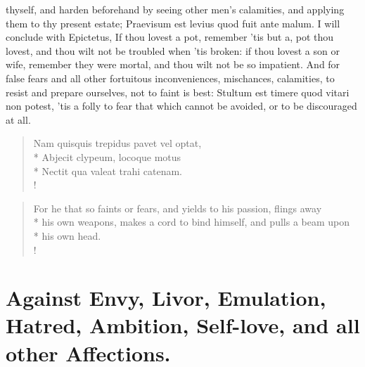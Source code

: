 {thyself, and harden beforehand by seeing other men's calamities, and
applying them to thy present estate; Praevisum est levius quod fuit
ante malum. I will conclude with Epictetus, If thou lovest a pot,
remember 'tis but a, pot thou lovest, and thou wilt not be troubled
when 'tis broken: if thou lovest a son or wife, remember they were
mortal, and thou wilt not be so impatient. And for false fears and all
other fortuitous inconveniences, mischances, calamities, to resist and
prepare ourselves, not to faint is best: Stultum est timere quod
vitari non potest, 'tis a folly to fear that which cannot be avoided,
or to be discouraged at all.
%
\begin{latin}%
\begin{verse}%
Nam quisquis trepidus pavet vel optat,\\*
Abjecit clypeum, locoque motus\\*
Nectit qua valeat trahi catenam.\\!
\end{verse}%
\end{latin}%
\begin{verse}%
For he that so faints or fears, and yields to his passion, flings away\\*
his own weapons, makes a cord to bind himself, and pulls a beam upon\\*
his own head.\\!
\end{verse}%


\section[Against Envy, Livor, Emulation,\ldots{}]{Against Envy, Livor, Emulation, Hatred, Ambition, Self-love, and all other Affections.}

}
